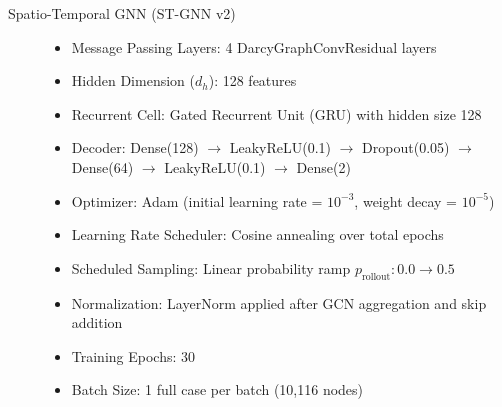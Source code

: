 \begin{description}
    \item[Spatio-Temporal GNN (ST-GNN v2)]
    \begin{itemize}
        \item Message Passing Layers: 4 DarcyGraphConvResidual layers
        \item Hidden Dimension ($d_h$): 128 features
        \item Recurrent Cell: Gated Recurrent Unit (GRU) with hidden size 128
        \item Decoder: Dense(128) $\to$ LeakyReLU(0.1) $\to$ Dropout(0.05) $\to$ Dense(64) $\to$ LeakyReLU(0.1) $\to$ Dense(2)
        \item Optimizer: Adam (initial learning rate = $10^{-3}$, weight decay = $10^{-5}$)
        \item Learning Rate Scheduler: Cosine annealing over total epochs
        \item Scheduled Sampling: Linear probability ramp $p_{\text{rollout}} : 0.0 \to 0.5$
        \item Normalization: LayerNorm applied after GCN aggregation and skip addition
        \item Training Epochs: 30
        \item Batch Size: 1 full case per batch (10,116 nodes)
    \end{itemize}
\end{description}
